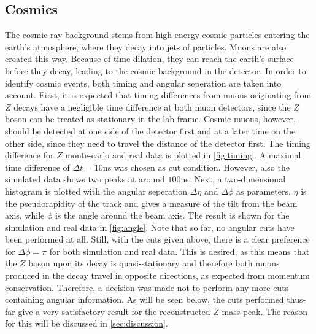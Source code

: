 \documentclass[twoside,        %
               BCOR12mm,       %
               ngerman,english, %
               fleqn,headsepline=false,footsepline=false
              ]{Vorlage/MFPREPORT}
\begin{document}
\subsection{Cosmics}
The cosmic-ray background stems from high energy cosmic particles entering the
earth's atmosphere, where they decay into jets of particles. Muons are also
created this way. Because of time dilation, they can reach the earth's surface
before they decay, leading to the cosmic background in the detector.
In order to identify cosmic events, both timing and angular seperation are
taken into account. First, it is expected that timing differences from muons
originating from $Z$ decays have a negligible time difference at both muon
detectors, since the $Z$ boson can be treated as stationary in the lab frame.
Cosmic muons, however, should be detected at one side of the detector first and
at a later time on the other side, since they need to travel the distance of
the detector first. The timing difference for $Z$ monte-carlo and real data is
plotted in \cref{fig:timing}. A maximal time difference of $\Delta t=10$\;ns
was chosen as cut condition. However, also the simulated data shows two peaks
at around $100$\;ns.
Next, a two-dimensional histogram is plotted with the angular seperation
$\Delta\eta$ and $\Delta\phi$ as parameters. $\eta$ is the pseudorapidity of the
track and gives a measure of the tilt from the beam axis, while $\phi$  is the
angle around the beam axis. The result is shown for the simulation and real
data in \cref{fig:angle}. Note that so far, no angular cuts have been performed
at all. Still, with the cuts given above, there is a clear preference for
$\Delta\phi=\pi$ for both simulation and real data. This is desired, as this
means that the $Z$ boson upon its decay is quasi-stationary and therefore both
muons produced in the decay travel in opposite directions, as expected from
momentum conservation. Therefore, a decision was made not to perform any more
cuts containing angular information. As will be seen below, the cuts performed
thus-far give a very satisfactory result for the reconstructed $Z$ mass peak.
The reason for this will be discussed in \cref{sec:discussion}.
\end{document}
